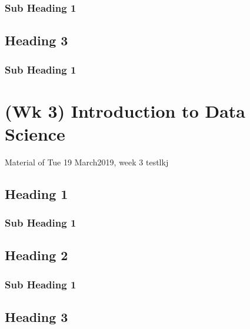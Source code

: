 \documentclass[]{book}
\begin{document}
\hypertarget{sub-heading-1-1}{%
\subsection{Sub Heading 1}\label{sub-heading-1-1}}

\hypertarget{heading-3}{%
\section{Heading 3}\label{heading-3}}

\hypertarget{sub-heading-1-2}{%
\subsection{Sub Heading 1}\label{sub-heading-1-2}}

\hypertarget{wk-3-introduction-to-data-science}{%
\chapter{(Wk 3) Introduction to Data Science}\label{wk-3-introduction-to-data-science}}

Material of Tue 19 March2019, week 3
testlkj

\hypertarget{heading-1-1}{%
\section{Heading 1}\label{heading-1-1}}

\hypertarget{sub-heading-1-3}{%
\subsection{Sub Heading 1}\label{sub-heading-1-3}}

\hypertarget{heading-2-1}{%
\section{Heading 2}\label{heading-2-1}}

\hypertarget{sub-heading-1-4}{%
\subsection{Sub Heading 1}\label{sub-heading-1-4}}

\hypertarget{heading-3-1}{%
\section{Heading 3}\label{heading-3-1}}
\end{document}
